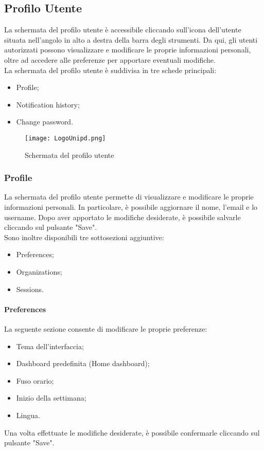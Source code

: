 \documentclass[10pt]{article}
\begin{document}
\begin{justify}
\subsection{Profilo Utente}
La schermata del profilo utente è accessibile cliccando sull'icona dell'utente situata nell'angolo in alto a destra della barra degli strumenti. Da qui, gli utenti autorizzati possono visualizzare e modificare le proprie informazioni personali, oltre ad accedere alle preferenze per apportare eventuali modifiche.\\
La schermata del profilo utente è suddivisa in tre schede principali:  
\begin{itemize}  
    \item Profile; 
    \item Notification history; 
    \item Change password.  
\end{itemize}
\begin{figure}[H]
\centering
\texttt{[image: LogoUnipd.png]}
\caption{Schermata del profilo utente}
\end{figure}
    
    \subsubsection{Profile}
    La schermata del profilo utente permette di visualizzare e modificare le proprie informazioni personali. In particolare, è possibile aggiornare il nome, l'email e lo username. Dopo aver apportato le modifiche desiderate, è possibile salvarle cliccando sul pulsante "Save".\\
    Sono inoltre disponibili tre sottosezioni aggiuntive:
    \begin{itemize}
        \item Preferences;
        \item Organizations;
        \item Sessions.
    \end{itemize}

    \paragraph{Preferences}
    La seguente sezione consente di modificare le proprie preferenze:  
    \begin{itemize}  
        \item Tema dell'interfaccia;  
        \item Dashboard predefinita (Home dashboard);  
        \item Fuso orario;  
        \item Inizio della settimana;  
        \item Lingua.  
    \end{itemize}  
    Una volta effettuate le modifiche desiderate, è possibile confermarle cliccando sul pulsante "Save". 
    

\end{justify}
\end{document}
